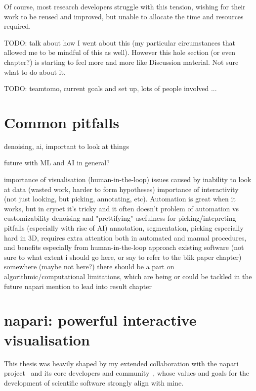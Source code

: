 Of course, most research developers struggle with this tension, wishing for their work to be reused and improved, but unable to allocate the time and resources required.

TODO: talk about how I went about this (my particular circumstances that allowed me to be mindful of this as well). However this hole section (or even chapter?) is starting to feel more and more like Discussion material. Not sure what to do about it.

TODO: teamtomo, current goals and set up, lots of people involved ...

\section{Common pitfalls}

denoising, ai, important to look at things

future with ML and AI in general?


\begin{outline}
\1 importance of visualisation (human-in-the-loop)
    \2 issues caused by inability to look at data (wasted work, harder to form hypotheses)
    \2 importance of interactivity (not just looking, but picking, annotating, etc). Automation is great when it works, but in cryoet it's tricky and it often doesn't
        \3 problem of automation vs customizability
\1 denoising and "prettifying"
    \2 usefulness for picking/intepreting
    \2 pitfalls (especially with rise of AI)
\1 annotation, segmentation, picking
    \2 especially hard in 3D, requires extra attention both in automated and manual procedures, and benefits especially from human-in-the-loop approach
    \2 existing software (not sure to what extent i should go here, or say to refer to the blik paper chapter)
\1 somewhere (maybe not here?) there should be a part on algorithmic/computational limitations, which are being or could be tackled in the future
\1 napari mention to lead into result chapter
\end{outline}


\section{napari: powerful interactive visualisation}

This thesis was heavily shaped by my extended collaboration with the napari project~\cite{thenaparicommunityNapariMultidimensionalImage2024} and its core developers and community~\cite{thenaparicommunityCommunityNapari2024}, whose values and goals for the development of scientific software strongly align with mine.

